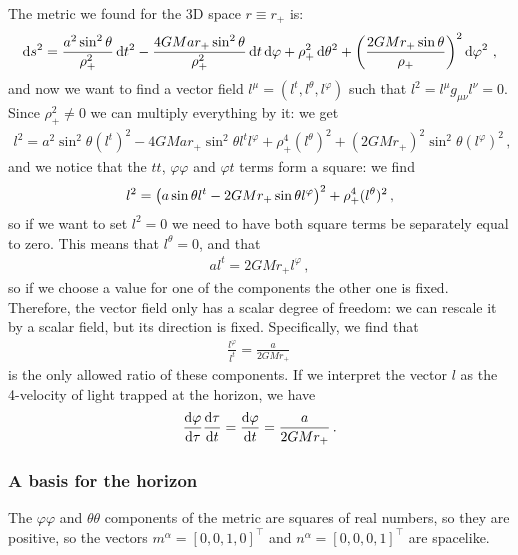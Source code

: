 \documentclass[main.tex]{subfiles}
\begin{document}
The metric we found for the 3D space \(r \equiv r_{+}\) is: 
%
\begin{align}
  \dd{s^2} = \frac{a^2 \sin^2\theta }{\rho_{+}^2} \dd{t^2} 
  - \frac{4GM a r_{+} \sin^2\theta }{\rho_{+}^2} \dd{t} \dd{\varphi } + \rho_{+}^2 \dd{\theta^2}
  + \qty(\frac{2GMr_{+} \sin \theta }{\rho_{+}})^2 \dd{\varphi^2}
\,,
\end{align}
%
and now we want to find a vector field \(l^{\mu } = (l^{t}, l^{\theta }, l^{\varphi })\) such that \(l^2 = l^{\mu } g_{\mu \nu } l^{\nu } = 0\). 
Since \(\rho_{+}^2 \neq 0\) we can multiply everything by it: we get 
%
\begin{align}
  l^2 = a^2 \sin^2\theta (l^{t})^2 
  - 4GMar_{+} \sin^2\theta l^{t} l^{\varphi }
  + \rho_{+}^{4} (l^{\theta })^2
  + (2GMr_{+})^2 \sin^2 \theta (l^{\varphi })^2
\,,
\end{align}
%
and we notice that the \(tt\), \(\varphi \varphi \) and \(\varphi t\) terms form a square: we find 
%
\begin{align}
  l^2= \qty(a \sin \theta l^{t} - 2GMr_{+} \sin \theta l^{\varphi })^2 + \rho_{+}^4 (l^{\theta })^2
\,,
\end{align}
%
so if we want to set \(l^2 = 0\) we need to have both square terms be separately equal to zero. 
This means that \(l^{\theta } = 0\), and that 
%
\begin{align}
  a l^{t} = 2GMr_{+} l^{\varphi }
\,,
\end{align}
%
so if we choose a value for one of the components the other one is fixed. Therefore, the vector field only has a scalar degree of freedom: we can rescale it by a scalar field, but its direction is fixed. Specifically, we find that 
%
\begin{align}
  \frac{l^{\varphi }}{l^{t}}  = \frac{a}{2GMr_{+}}
\,
\end{align}
%
is the only allowed ratio of these components. If we interpret the vector \(l\) as the 4-velocity of light trapped at the horizon, we have 
%
\begin{align}
    \dv{\varphi }{\tau } \dv{\tau }{t} = \dv{\varphi }{t}
    = \frac{a}{2GMr_{+}}
\,.
\end{align}

\subsubsection{A basis for the horizon}

The \(\varphi \varphi \) and \(\theta \theta \) components of the metric are squares of real numbers, so they are positive, so the vectors \(m^{\alpha } = [0,0,1,0]^{\top}\) and \(n^{\alpha } = [0,0,0,1]^{\top}\) are spacelike. 
\end{document}
